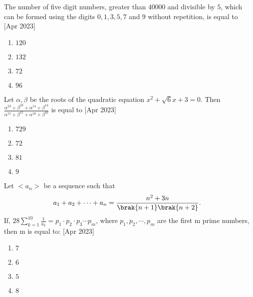 \iffalse
\title{assignment}
\author{ee24btech11064}
\section{mcq-single}
\fi

\item The number of five digit numbers, greater than $40000$ and divisible by $5$, which can be formed using the digits $0, 1, 3, 5, 7$ and $9$ without repetition, is equal to \hfill[Apr 2023]
\begin{multicols}{2}
\begin{enumerate}
    \item $120$
    \item $132$
    \item $72$
    \item $96$ 
\end{enumerate}
\end{multicols}

\item Let $\alpha,\beta$ be the roots of the quadratic equation $x^2+\sqrt{6}x+3=0$. Then $\frac{\alpha^{23}+\beta^{23}+\alpha^{14}+\beta^{14}}{\alpha^{15}+\beta^{15}+\alpha^{10}+\beta^{10}}$ is equal to \hfill[Apr 2023]
\begin{multicols}{2}
\begin{enumerate}
    \item $729$
    \item $72$
    \item $81$
    \item $9$
\end{enumerate}
\end{multicols}

\item Let $<a_n>$ be a sequence such that 
\begin{align*}
    a_1+a_2+\cdots +a_n=\frac{n^2+3n}{\brak{n+1}\brak{n+2}}.
\end{align*}
If, $28\sum_{k=1}^{10} \frac{1}{a_k} = p_1 \cdot p_2 \cdot p_3 \cdots p_m$, where $p_1, p_2, \cdots, p_m$
are the first m prime numbers, then m is equal to: \hfill[Apr 2023]
\begin{multicols}{2}
\begin{enumerate}
       \item $7$
       \item $6$
       \item $5$
       \item $8$
\end{enumerate}
\end{multicols}


